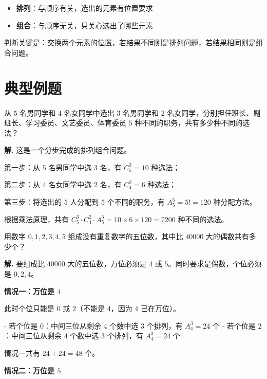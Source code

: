 \documentclass[11pt]{ctexrep}
\begin{document}
\begin{property}[排列与组合的区别]
    \begin{itemize}
        \item \textbf{排列}：与顺序有关，选出的元素有位置要求
        \item \textbf{组合}：与顺序无关，只关心选出了哪些元素
    \end{itemize}
    判断关键是：交换两个元素的位置，若结果不同则是排列问题，若结果相同则是组合问题。
\end{property}

\section*{典型例题}

\begin{example}[基础排列计算]
    从 $5$ 名男同学和 $4$ 名女同学中选出 $3$ 名男同学和 $2$ 名女同学，分别担任班长、副班长、学习委员、文艺委员、体育委员 $5$ 种不同的职务，共有多少种不同的选法？
\end{example}

\textbf{解.} 这是一个分步完成的排列组合问题。

第一步：从 $5$ 名男同学中选 $3$ 名，有 $C_5^3 = 10$ 种选法；

第二步：从 $4$ 名女同学中选 $2$ 名，有 $C_4^2 = 6$ 种选法；

第三步：将选出的 $5$ 人分配到 $5$ 个不同的职务，有 $A_5^5 = 5! = 120$ 种分配方法。

根据乘法原理，共有 $C_5^3 \cdot C_4^2 \cdot A_5^5 = 10 \times 6 \times 120 = 7200$ 种不同的选法。

\begin{example}[特殊位置优先法]
    用数字 $0, 1, 2, 3, 4, 5$ 组成没有重复数字的五位数，其中比 $40000$ 大的偶数共有多少个？
\end{example}

\textbf{解.} 要组成比 $40000$ 大的五位数，万位必须是 $4$ 或 $5$。同时要求是偶数，个位必须是 $0, 2, 4$。

\textbf{情况一：万位是 $4$}

此时个位只能是 $0$ 或 $2$（不能是 $4$，因为 $4$ 已在万位）。

- 若个位是 $0$：中间三位从剩余 $4$ 个数中选 $3$ 个排列，有 $A_4^3 = 24$ 个
- 若个位是 $2$：中间三位从剩余 $4$ 个数中选 $3$ 个排列，有 $A_4^3 = 24$ 个

情况一共有 $24 + 24 = 48$ 个。

\textbf{情况二：万位是 $5$}
\end{document}
